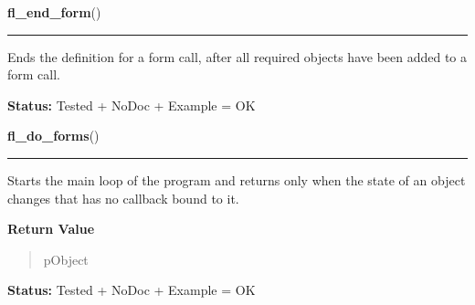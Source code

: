     \vspace{0.5ex}

\hspace{.8\funcindent}\begin{boxedminipage}{\funcwidth}

    \raggedright \textbf{fl\_end\_form}()

    \vspace{-1.5ex}

    \rule{\textwidth}{0.5\fboxrule}
\setlength{\parskip}{2ex}
    Ends the definition for a form call, after all required objects have 
    been added to a form call.

\setlength{\parskip}{1ex}
\textbf{Status:} Tested + NoDoc + Example = OK



    \end{boxedminipage}

    \label{xformslib:library:fl_do_forms}

    \vspace{0.5ex}

\hspace{.8\funcindent}\begin{boxedminipage}{\funcwidth}

    \raggedright \textbf{fl\_do\_forms}()

    \vspace{-1.5ex}

    \rule{\textwidth}{0.5\fboxrule}
\setlength{\parskip}{2ex}
    Starts the main loop of the program and returns only when the state of 
    an object changes that has no callback bound to it.

\setlength{\parskip}{1ex}
      \textbf{Return Value}
    \vspace{-1ex}

      \begin{quote}
      pObject

      \end{quote}

\textbf{Status:} Tested + NoDoc + Example = OK



    \end{boxedminipage}

    \label{xformslib:library:fl_check_forms}

